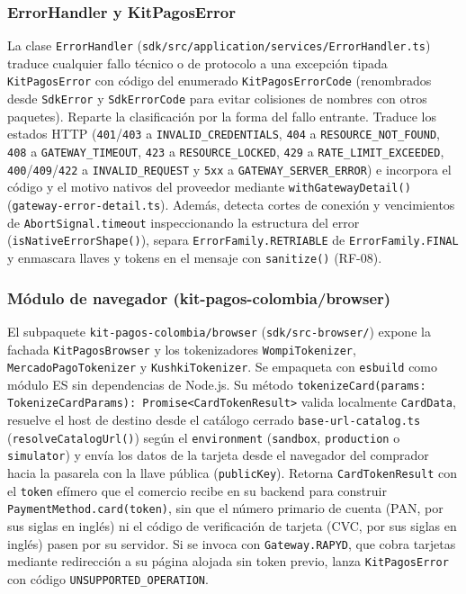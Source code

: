 \subsubsection{ErrorHandler y KitPagosError}
La clase \texttt{ErrorHandler} (\texttt{sdk/src/application/services/ErrorHandler.ts}) traduce cualquier fallo técnico o de protocolo a una excepción tipada \texttt{KitPagosError} con código del enumerado \texttt{KitPagosErrorCode} (renombrados desde \texttt{SdkError} y \texttt{SdkErrorCode} para evitar colisiones de nombres con otros paquetes). Reparte la clasificación por la forma del fallo entrante. Traduce los estados HTTP (\texttt{401}/\texttt{403} a \texttt{INVALID\_CREDENTIALS}, \texttt{404} a \texttt{RESOURCE\_NOT\_FOUND}, \texttt{408} a \texttt{GATEWAY\_TIMEOUT}, \texttt{423} a \texttt{RESOURCE\_LOCKED}, \texttt{429} a \texttt{RATE\_LIMIT\_EXCEEDED}, \texttt{400}/\texttt{409}/\texttt{422} a \texttt{INVALID\_REQUEST} y \texttt{5xx} a \texttt{GATEWAY\_SERVER\_ERROR}) e incorpora el código y el motivo nativos del proveedor mediante \texttt{withGatewayDetail()} (\texttt{gateway-error-detail.ts}). Además, detecta cortes de conexión y vencimientos de \texttt{AbortSignal.timeout} inspeccionando la estructura del error (\texttt{isNativeErrorShape()}), separa \texttt{ErrorFamily.RETRIABLE} de \texttt{ErrorFamily.FINAL} y enmascara llaves y tokens en el mensaje con \texttt{sanitize()} (RF-08).

\subsubsection{Módulo de navegador (kit-pagos-colombia/browser)}
El subpaquete \texttt{kit-pagos-colombia/browser} (\texttt{sdk/src-browser/}) expone la fachada \texttt{KitPagosBrowser} y los tokenizadores \texttt{WompiTokenizer}, \texttt{MercadoPagoTokenizer} y \texttt{KushkiTokenizer}. Se empaqueta con \texttt{esbuild} como módulo ES sin dependencias de Node.js. Su método \texttt{tokenizeCard(params: TokenizeCardParams): Promise<CardTokenResult>} valida localmente \texttt{CardData}, resuelve el host de destino desde el catálogo cerrado \texttt{base-url-catalog.ts} (\texttt{resolveCatalogUrl()}) según el \texttt{environment} (\texttt{sandbox}, \texttt{production} o \texttt{simulator}) y envía los datos de la tarjeta desde el navegador del comprador hacia la pasarela con la llave pública (\texttt{publicKey}). Retorna \texttt{CardTokenResult} con el \texttt{token} efímero que el comercio recibe en su backend para construir \texttt{PaymentMethod.card(token)}, sin que el número primario de cuenta (PAN, por sus siglas en inglés) ni el código de verificación de tarjeta (CVC, por sus siglas en inglés) pasen por su servidor. Si se invoca con \texttt{Gateway.RAPYD}, que cobra tarjetas mediante redirección a su página alojada sin token previo, lanza \texttt{KitPagosError} con código \texttt{UNSUPPORTED\_OPERATION}.

